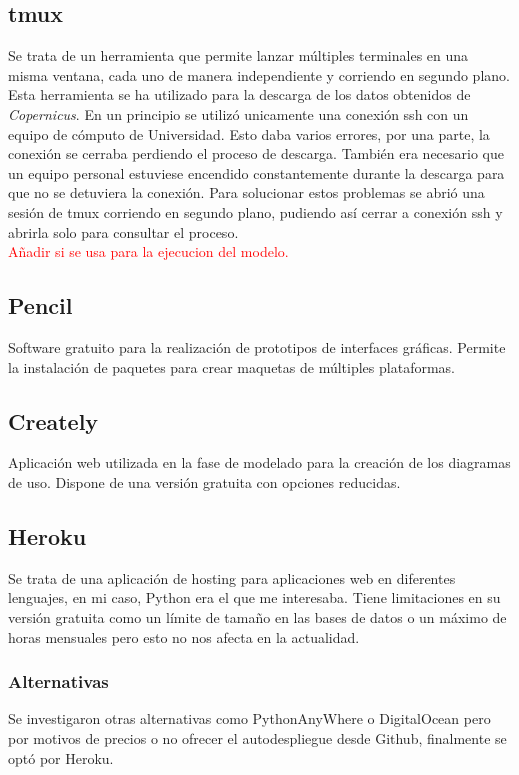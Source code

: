 	\subsection{tmux}\label{tmux}
Se trata de un herramienta que permite lanzar múltiples terminales en una misma ventana, cada uno de manera independiente y corriendo en segundo plano. Esta herramienta se ha utilizado para la descarga de los datos obtenidos de \emph{Copernicus}. En un principio se utilizó unicamente una conexión ssh con un equipo de cómputo de Universidad. Esto daba varios errores, por una parte, la conexión se cerraba perdiendo el proceso de descarga. También era necesario que un equipo personal estuviese encendido constantemente durante la descarga para que no se detuviera la conexión. Para solucionar estos problemas se abrió una sesión de tmux corriendo en segundo plano, pudiendo así cerrar a conexión ssh y abrirla solo para consultar el proceso.\\
\textcolor{red}{Añadir si se usa para la ejecucion del modelo.}

	\subsection{Pencil}
Software gratuito para la realización de prototipos de interfaces gráficas. Permite la instalación de paquetes para crear maquetas de múltiples plataformas. 
	
	\subsection{Creately}
Aplicación web utilizada en la fase de modelado para la creación de los diagramas de uso. Dispone de una versión gratuita con opciones reducidas.

	\subsection{Heroku}\label{HerokuHerrramientas}
Se trata de una aplicación de hosting para aplicaciones web en diferentes lenguajes, en mi caso, Python era el que me interesaba. 
Tiene limitaciones en su versión gratuita como un límite de tamaño en las bases de datos o un máximo de horas mensuales pero esto no nos afecta en la actualidad.
	\subsubsection{Alternativas}
Se investigaron otras alternativas como PythonAnyWhere o DigitalOcean pero por motivos de precios o no ofrecer el autodespliegue desde Github, finalmente se optó por Heroku.

